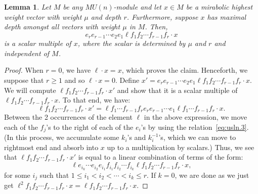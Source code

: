 \documentclass{amsart}
\numberwithin{equation}{section}
\theoremstyle{theorem}
\newtheorem{lemma}[theorem]{Lemma}
\theoremstyle{definition}
\begin{document}
\begin{lemma} \label{lem:maincalc}
Let $M$ be any $MU(n)$-module and let $x\in M$ be a mirabolic highest weight vector with weight $\mu$ and depth $r$. Furthermore, suppose $x$ has maximal depth amongst all vectors with weight $\mu$ in $M$. Then,
\[e_{r}e_{r - 1}\cdots e_2e_1 \ell f_1 f_2\cdots f_{r-1} f_{r} \cdot x\]
is a scalar multiple of $x$, where the scalar is determined by $\mu$ and $r$ and independent of $M$.
\end{lemma}

\begin{proof}
When $r=0$, we have $\ell\cdot x=x$, which proves the claim. Henceforth, we suppose that $r\geq 1$ and so $\ell\cdot x=0$. Define $x'=e_{r} e_{r - 1}\cdots e_2 e_1 \ell f_1 f_2\cdots f_{r-1} f_{r}\cdot x$. We will compute $\ell f_1 f_2\cdots f_{r-1} f_{r} \cdot x'$ and show that it is a scalar multiple of $\ell f_1 f_2\cdots f_{r-1} f_{r} \cdot x$. To that end, we have:
\[ \ell f_1 f_2\cdots f_{r-1} f_{r} \cdot x' = \ell f_1\cdots f_{r-1} f_{r} e_{r} e_{r - 1}\cdots e_1 \ell f_1\cdots f_{r-1} f_{r} \cdot x.\]
Between the 2 occurrences of the element $\ell$ in the above expression, we move each of the $f_j$'s to the right of each of the $e_i$'s by using the relation~\eqref{eq:usln.3}. (In this process, we accumulate some $k_i$'s and $k_i^{-1}$'s, which we can move to rightmost end and absorb into $x$ up to a multiplication by scalars.) Thus, we see that $\ell f_1 f_2\cdots f_{r-1} f_{r} \cdot x'$ is equal to a linear combination of terms of the form:
\[\ell e_{i_k}\cdots e_{i_2} e_{i_1} f_{i_1} f_{i_2}\cdots f_{i_k}  \ell f_1 f_2\cdots f_{r-1} f_{r} \cdot x,\]
for some $i_j$ such that $1\leq i_1< i_2<\cdots <i_k\leq r$. If $k=0$, we are done as we just get $\ell^2 f_1 f_2\cdots f_{r-1} f_{r} \cdot x=\ell f_1 f_2\cdots f_{r-1} f_{r} \cdot x$.


\end{proof}
\end{document}
